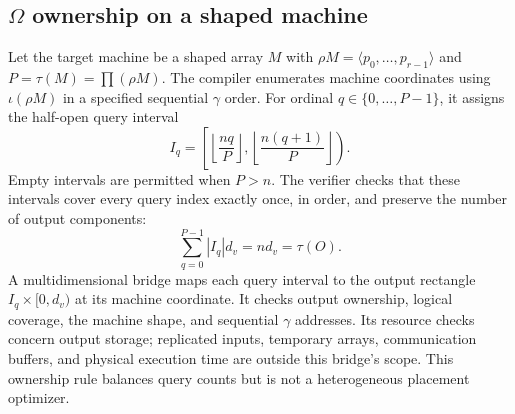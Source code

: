 \documentclass[11pt]{article}
\begin{document}
\subsection{$\Omega$ ownership on a shaped machine}
\label{step108:subsec:omega-ownership}

Let the target machine be a shaped array $M$ with
$\rho M=\langle p_0,\ldots,p_{r-1}\rangle$ and
$P=\tau(M)=\prod(\rho M)$.  The compiler enumerates machine coordinates
using $\iota(\rho M)$ in a specified sequential $\gamma$ order.  For ordinal
$q\in\{0,\ldots,P-1\}$, it assigns the half-open query interval
\begin{equation}
  I_q=\left[
    \left\lfloor\frac{nq}{P}\right\rfloor,
    \left\lfloor\frac{n(q+1)}{P}\right\rfloor
  \right).
  \label{step108:eq:moa-omega-interval}
\end{equation}
Empty intervals are permitted when $P>n$.  The verifier checks that these
intervals cover every query index exactly once, in order, and preserve the
number of output components:
\begin{equation}
  \sum_{q=0}^{P-1}|I_q|d_v=nd_v=\tau(O).
  \label{step108:eq:moa-output-conservation}
\end{equation}
A multidimensional bridge maps each query interval to the output rectangle
$I_q\times[0,d_v)$ at its machine coordinate.  It checks output ownership,
logical coverage, the machine shape, and sequential $\gamma$ addresses.  Its
resource checks concern output storage; replicated inputs, temporary arrays,
communication buffers, and physical execution time are outside this bridge's
scope.  This ownership rule balances query counts but is not a heterogeneous
placement optimizer.
\end{document}
